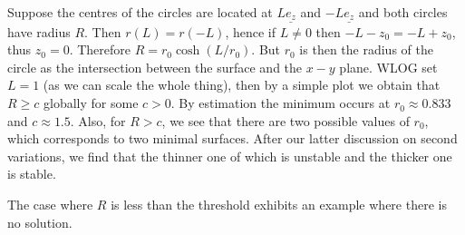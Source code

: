 \begin{example}
    Suppose the centres of the circles are located at $L\underline{e_z}$ and $-L\underline{e_z}$ and both circles have radius $R$.
    Then $r(L)=r(-L)$, hence if $L\neq 0$ then $-L-z_0=-L+z_0$, thus $z_0=0$.
    Therefore $R=r_0\cosh(L/r_0)$.
    But $r_0$ is then the radius of the circle as the intersection between the surface and the $x-y$ plane.
    WLOG set $L=1$ (as we can scale the whole thing), then by a simple plot we obtain that $R\ge c$ globally for some $c>0$.
    By estimation the minimum occurs at $r_0\approx 0.833$ and $c\approx 1.5$.
    Also, for $R>c$, we see that there are two possible values of $r_0$, which corresponds to two minimal surfaces.
    After our latter discussion on second variations, we find that the thinner one of which is unstable and the thicker one is stable.
\end{example}
The case where $R$ is less than the threshold exhibits an example where there is no solution.
